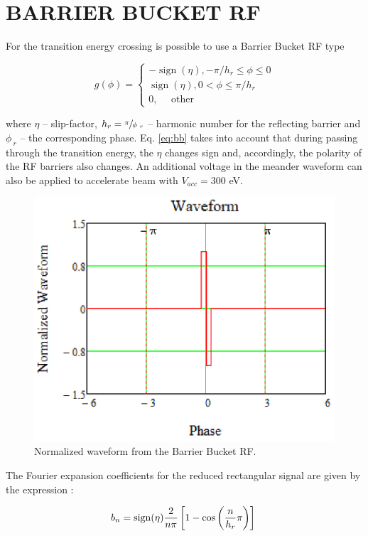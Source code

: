 \documentclass[
aps,%
12pt,%
final,%
notitlepage,%
oneside,%
onecolumn,%
nobibnotes,%
nofootinbib,%
superscriptaddress,%
noshowpacs,%
centertags]%
{revtex4}
\begin{document}
\section{BARRIER BUCKET RF}

\par For the transition energy crossing is possible to use a Barrier Bucket RF type \cite{rf1,rf1m}

\begin{equation}
g(\phi)=\left\{\begin{array}{c}
-\operatorname{sign}(\eta),-\pi / h_r \leq \phi \leq 0 \\
\operatorname{sign}(\eta), 0<\phi \leq \pi / h_r \\
0, \quad \text { other }
\end{array}\right.
\label{eq:bb}
\end{equation}

\par where $\eta$ -- slip-factor, $h_r=\sfrac{\pi}{\phi_{\ r}}$ -- harmonic number for the reflecting barrier and $\phi_{\ r}$ -- the corresponding phase.  Eq. \ref{eq:bb} takes into account that during passing through the transition energy, the $\eta$ changes sign and, accordingly, the polarity of the RF barriers also changes. An additional voltage in the meander waveform can also be applied to accelerate beam with $V_{acc}=300$ eV.

\begin{figure}[!h]
\setcaptionmargin{5mm}
   \includegraphics*[width=.6\columnwidth]{img/fig_04-1}
\caption{Normalized waveform from the Barrier Bucket RF.}
\label{fig:alpha}
\end{figure}

\par The Fourier expansion coefficients for the reduced rectangular signal are given by the expression \cite{bb}:

\begin{equation}
b_n={\rm sign}{\left(\eta\right)}\frac{2}{n\pi}\left[1-\cos{\left(\frac{n}{h_r}\pi\right)}\right]\ 
\label{bn}
\end{equation}
\end{document}
